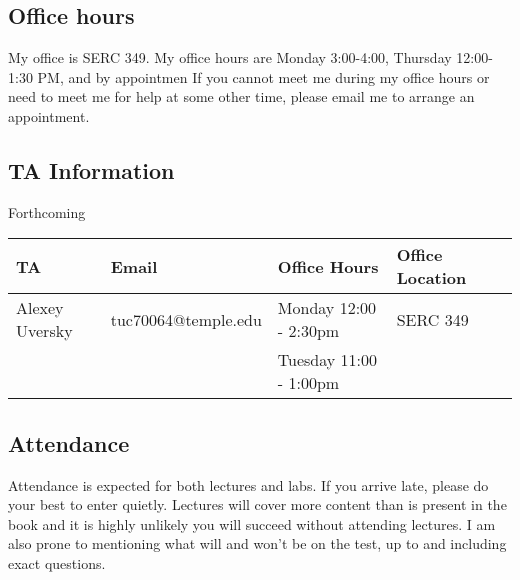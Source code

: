 \documentclass[10pt, letter]{article}
\begin{document}
\subsection*{Office hours}
My office is SERC 349.
My office hours are Monday 3:00-4:00, Thursday 12:00-1:30 PM, and by appointmen
If you cannot meet me during my office hours or need to meet me for help at some other time, please email me to arrange an appointment. 


\subsection*{TA Information}
Forthcoming

{\footnotesize
	\begin{tabular}{l l l l l}
		TA & Email &Office Hours & Office Location \\ \hline

		Alexey Uversky &tuc70064@temple.edu& Monday 12:00 - 2:30pm﻿ & SERC 349 \\
		﻿﻿
		 & &Tuesday 11:00 - 1:00pm & \\
	\end{tabular}
}









\subsection*{Attendance}
Attendance is expected for both lectures and labs.  
If you arrive late, please do your best to enter quietly.  
Lectures will cover more content than is present in the book and it is highly unlikely you will succeed without attending lectures.
I am also prone to mentioning what will and won't be on the test, up to and including exact questions.
\end{document}
